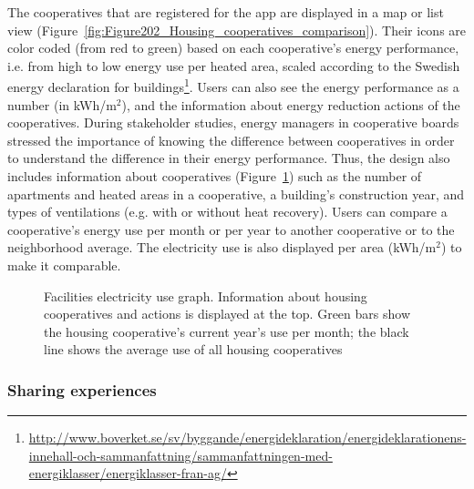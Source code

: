 The cooperatives that are registered for the app are displayed in a map or list view (Figure~\ref{fig:Figure202_Housing_cooperatives_comparison}). Their icons are color coded (from red to green) based on each cooperative's energy performance, i.e. from high to low energy use per heated area, scaled according to the Swedish energy declaration for buildings\footnote{\url{http://www.boverket.se/sv/byggande/energideklaration/energideklarationens-innehall-och-sammanfattning/sammanfattningen-med-energiklasser/energiklasser-fran-ag/}}. 
% 
Users can also see the energy performance as a number (in kWh/m$^2$), and the information about energy reduction actions of the cooperatives. %
% 
During stakeholder studies, energy managers in cooperative boards stressed the importance of knowing the difference between cooperatives in order to understand the difference in their energy performance. Thus, the design also includes information about cooperatives (Figure~\ref{fig:Figure204_Neighbourhood_average}) such as the number of apartments and heated areas in a cooperative, a building's construction year, and types of ventilations (e.g. with or without heat recovery).
% 
Users can compare a cooperative's energy use per month or per year to another cooperative or to the neighborhood average. The electricity use is also displayed per area (kWh/m$^2$) to make it comparable.
\begin{figure}
\centering
{}
\caption{Facilities electricity use graph. Information about housing cooperatives and actions is displayed at the top. Green bars show the housing cooperative's current year's use per month; the black line shows the average use of all housing cooperatives}
\label{fig:Figure204_Neighbourhood_average} 
\end{figure}

\subsubsection{Sharing experiences}

